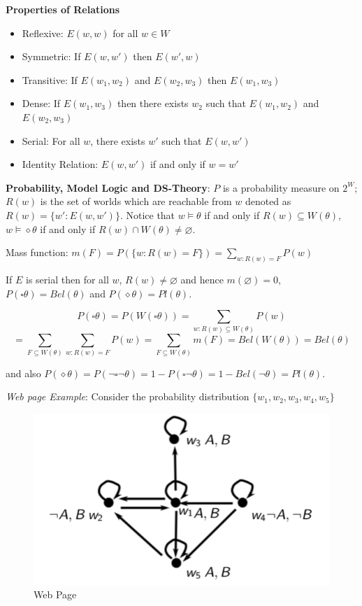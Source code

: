 \documentclass{article}
\begin{document}
\textbf{Properties of Relations}

\begin{itemize}
    \item Reflexive: $E(w, w)$ for all $w \in W$
    \item Symmetric: If $E(w, w')$ then $E(w', w)$
    \item Transitive: If $E(w_1, w_2)$ and $E(w_2, w_3)$ then $E(w_1, w_3)$
    \item Dense: If $E(w_1, w_3)$ then there exists $w_2$ such that $E(w_1, w_2)$ and $E(w_2, w_3)$
    \item Serial: For all $w$, there exists $w'$ such that $E(w, w')$
    \item Identity Relation: $E(w, w')$ if and only if $w = w'$
\end{itemize}

\textbf{Probability, Model Logic and DS-Theory}: $P$ is a probability measure on $2^W$; $R(w)$ is the set of worlds which are reachable from $w$ denoted as $R(w) = \{ w' : E(w, w') \}$. Notice that $w \models \theta$ if and only if $R(w) \subseteq W(\theta)$, $w \models \diamond \theta$ if and only if $R(w) \cap W(\theta) \neq \varnothing$.

Mass function: $m(F) = P(\{ w: R(w) = F \}) = \sum_{w:R(w)=F}P(w)$

If $E$ is serial then for all $w$, $R(w) \neq \varnothing$ and hence $m(\varnothing) = 0$, $P(\square \theta) = Bel(\theta)$ and $P(\diamond\theta) = Pl(\theta)$.

$$P(\square \theta) = P(W(\square \theta)) = \sum_{w: R(w)\subseteq W(\theta)}P(w)$$
$$= \sum_{F \subseteq W(\theta)}\sum_{w:R(w)=F}P(w) = \sum_{F\subseteq W(\theta)}m(F) = Bel(W(\theta)) = Bel(\theta)$$

and also $P(\diamond \theta) = P(\neg \square \neg \theta)  = 1- P(\square \neg \theta) = 1 - Bel(\neg \theta) = Pl(\theta)$.


\textit{Web page Example}: Consider the probability distribution $\{ w_1, w_2, w_3, w_4, w_5 \}$

\begin{figure}[h]
    \centering
    \includegraphics[scale=1]{images/example-web-page.png}
    \caption{Web Page}
    \label{fig:my_label}
\end{figure}
\end{document}
